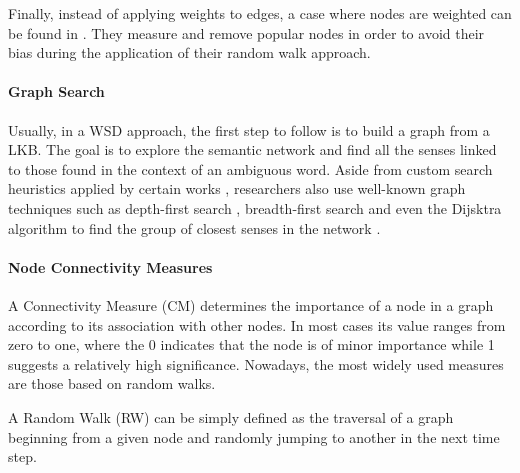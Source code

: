 Finally, instead of applying weights to edges, a case where  nodes are weighted can be found in \cite{2013.Kivimaki.AGraph-BasedApproach}. They measure and remove popular nodes in order to avoid their bias during the application of their random walk approach.




 

\paragraph{Graph Search} 
Usually, in a WSD approach, the first step to follow is to build a graph from a LKB. The goal is to explore the semantic network and find all the senses linked to  those found in the context of an ambiguous word. Aside from custom search heuristics applied by certain works \cite{2006.Agirre.TwoGraph-basedAlgorithms,2007.Sinha.Mihalcea.Unsupervised,2009.Agirre.PersonalizedPageRankWSD}, researchers also use well-known graph techniques such as depth-first search \cite{2007.Navigli.GraphConnectivity}, breadth-first search \cite{2008.Agirre.Multilingual} and even the Dijsktra  algorithm to find the group of closest senses in the network \cite{2013.Matuschek.Gurevych.Dijsktra.WSA}.


\paragraph{Node Connectivity Measures}\label{sec:connectivity_measures} 
A Connectivity Measure (CM) determines the importance of a node in a graph according to its association with other nodes. In most cases its value ranges from zero to one, where the 0 indicates that the node is of minor importance while 1 suggests a relatively high significance. Nowadays, the most widely used  measures are those based on random walks.

A Random Walk (RW) can be simply defined as the traversal of a graph beginning from a given node and randomly jumping to another in the next time step.

